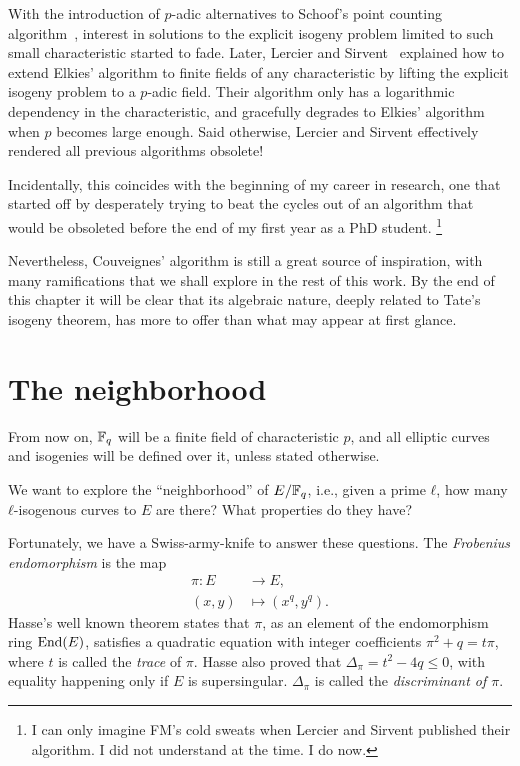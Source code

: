 \documentclass{report}
\theoremstyle{plain}
\theoremstyle{definition}
\begin{document}
With the introduction of $p$-adic alternatives to Schoof's point
counting
algorithm~\cite{satoh00,kedlaya01,kedlaya04,lauder04,10.2307/24522768},
interest in solutions to the explicit isogeny problem limited to such
small characteristic started to fade. %
Later, Lercier and Sirvent~\cite{lercier+sirvent08} explained how to
extend Elkies' algorithm to finite fields of any characteristic by
lifting the explicit isogeny problem to a $p$-adic field. %
Their algorithm only has a logarithmic dependency in the
characteristic, and gracefully degrades to Elkies' algorithm when $p$
becomes large enough. %
Said otherwise, Lercier and Sirvent effectively rendered all previous
algorithms obsolete! %

Incidentally, this coincides with the beginning of my career in
research, one that started off by desperately trying to beat the
cycles out of an algorithm that would be obsoleted before the end of
my first year as a PhD student.%
\footnote{I can only imagine FM's cold sweats
  when Lercier and Sirvent published their algorithm. I did not
  understand at the time. I do now.}

Nevertheless, Couveignes' algorithm is still a great source of
inspiration, with many ramifications that we shall explore in the rest
of this work. %
By the end of this chapter it will be clear that its algebraic nature,
deeply related to Tate's isogeny theorem, has more to offer than what
may appear at first glance. %


\section{The neighborhood}

From now on, $\mathbb{F}_q$ will be a finite field of characteristic $p$, and
all elliptic curves and isogenies will be defined over it, unless
stated otherwise. %

We want to explore the ``neighborhood'' of $E/\mathbb{F}_q$, i.e., given a
prime $ℓ$, how many $ℓ$-isogenous curves to $E$ are there? What
properties do they have?

Fortunately, we have a Swiss-army-knife to answer these questions. %
The \emph{Frobenius endomorphism} is the map
\begin{equation*}
  \begin{aligned}
    π : E &→ E,\\
    (x,y) &↦ (x^q,y^q).
  \end{aligned}
\end{equation*}
Hasse's well known theorem states that $π$, as an element of the
endomorphism ring $\operatorname{End}(E)$, satisfies a quadratic equation with
integer coefficients $π^2 + q = tπ$, where $t$ is called the
\emph{trace} of $π$. %
Hasse also proved that $Δ_π=t^2-4q≤0$, with equality happening only if
$E$ is supersingular. %
$Δ_π$ is called the \emph{discriminant of $π$}. %
\end{document}
